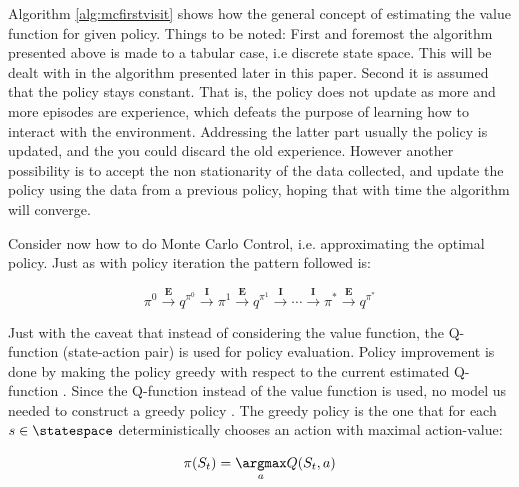 Algorithm \ref{alg:mcfirstvisit} shows how the general concept of estimating the value function for given policy. Things to be noted: First and foremost the algorithm presented above is made to a tabular case, i.e discrete state space. This will be dealt with in the algorithm presented later in this paper. Second it is assumed that the policy stays constant. That is, the policy does not update as more and more episodes are experience, which defeats the purpose of learning how to interact with the environment. Addressing the latter part usually the policy is updated, and the you could discard the old experience. However another possibility is to accept the non stationarity of the data collected, and update the policy using the data from a previous policy, hoping that with time the algorithm will converge.

Consider now how to do Monte Carlo Control, i.e. approximating the optimal policy. Just as with policy iteration the pattern followed is:

\begin{equation}
    \label{eq:montecarlocontrol}
    \pi^0 \overset{\textbf{E}}{\longrightarrow}
    q^{\pi^0} \overset{\textbf{I}}{\longrightarrow} \pi^1 \overset{\textbf{E}}{\longrightarrow} q^{\pi^1} \overset{\textbf{I}}{\longrightarrow} \cdots \overset{\textbf{I}}{\longrightarrow} \pi^* \overset{\textbf{E}}{\longrightarrow} q^{\pi^*}
\end{equation}

Just with the caveat that instead of considering the value function, the Q-function (state-action pair) is used for policy evaluation. Policy improvement is done by making the policy greedy with respect to the current estimated Q-function \parencite{sutton_reinforcement_2018}. Since the Q-function instead of the value function is used, no model us needed to construct a greedy policy \parencite{sutton_reinforcement_2018}. The greedy policy is the one that for each $s \in \statespace$ deterministically chooses an action with maximal action-value:

\begin{equation}
    \pi(S_t) = \underset{a}{\argmax}  Q( S_t, a )
\end{equation}

